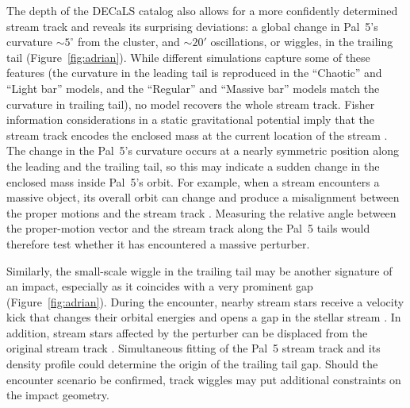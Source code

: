 \documentclass[twocolumn]{aastex62}
\newcommand{\ab}[1]{{\color{teal} AB: #1}}
\newcommand{\sa}[1]{{\color{magenta} SP: #1}}
\begin{document}
The depth of the DECaLS catalog also allows for a more confidently determined stream track and reveals its surprising deviations: a global change in Pal~5's curvature $\sim5^\circ$ from the cluster, and $\sim20'$ oscillations, or wiggles, in the trailing tail (Figure~\ref{fig:adrian}).
While different simulations capture some of these features (the curvature in the leading tail is reproduced in the ``Chaotic'' and ``Light bar'' models, and the ``Regular'' and ``Massive bar'' models match the curvature in trailing tail), no model recovers the whole stream track.
Fisher information considerations in a static gravitational potential imply that the stream track encodes the enclosed mass at the current location of the stream \citep{Bonaca:2018}.
The change in the Pal~5's curvature occurs at a nearly symmetric position along the leading and the trailing tail, so this may indicate a sudden change in the enclosed mass inside Pal~5's orbit.
For example, when a stream encounters a massive object, its overall orbit can change and produce a misalignment between the proper motions and the stream track \citep{Erkal:2018, Koposov:2019}.
Measuring the relative angle between the proper-motion vector and the stream track along the Pal~5 tails would therefore test whether it has encountered a massive perturber.

Similarly, the small-scale wiggle in the trailing tail may be another signature of an impact, especially as it coincides with a very prominent gap (Figure~\ref{fig:adrian}).
During the encounter, nearby stream stars receive a velocity kick that changes their orbital energies and opens a gap in the stellar stream \citep[e.g.,][]{Erkal:2015b}.
In addition, stream stars affected by the perturber can be displaced from the original stream track \citep{Bonaca:2018b}.
Simultaneous fitting of the Pal~5 stream track and its density profile could determine the origin of the trailing tail gap.
Should the encounter scenario be confirmed, track wiggles may put additional constraints on the impact geometry.


\end{document}
